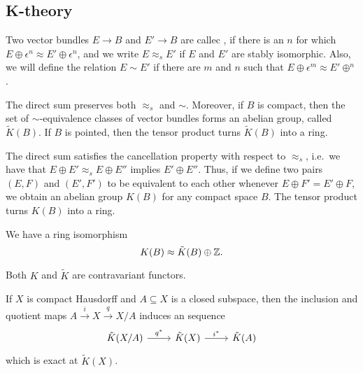 \documentclass{article}
\begin{document}
\subsection{K-theory}

\begin{defn}
Two vector bundles $E\to B$ and $E'\to B$ are callec ,
if there is an $n$ for which $E\oplus\epsilon^n\approx E'\oplus\epsilon^n$, and
we write $E\approx_s E'$ if $E$ and $E'$ are stably isomorphic. Also,
we will define the relation $E\sim E'$ if there are $m$ and $n$ such that
$E\oplus\epsilon^m\approx E'\oplus^n$. 
\end{defn}

\begin{lem}
The direct sum preserves both $\approx_s$ and $\sim$. Moreover, if $B$ is compact,
then the set of ${\sim}$-equivalence classes of vector bundles forms an abelian
group, called $\tilde{K}(B)$. If $B$ is pointed, then the tensor product turns 
$\tilde{K}(B)$ into a ring.
\end{lem}

\begin{lem}
The direct sum satisfies the cancellation property with respect to $\approx_s$,
i.e.~we have that $E\oplus E'\approx_s E\oplus E''$ implies $E'\oplus E''$. 
Thus, if we define two pairs $(E,F)$ and $(E',F')$ to be equivalent to each
other whenever $E\oplus F'=E'\oplus F$, we obtain an abelian group $K(B)$ for
any compact space $B$. The tensor product turns $K(B)$ into a ring.
\end{lem}

\begin{lem}
We have a ring isomorphism
\begin{equation*}
K(B)\approx \tilde{K}(B)\oplus\mathbb{Z}.
\end{equation*}
\end{lem}

Both $K$ and $\tilde{K}$ are contravariant functors.

\begin{lem}
If $X$ is compact Hausdorff and $A\subseteq X$ is a closed subspace, then the
inclusion and quotient maps $A\stackrel{i}{\to}X\stackrel{q}{\to}X/A$ induces
an sequence
\begin{equation*}
\begin{tikzcd}
\tilde{K}(X/A) \arrow[r,"q^\ast"] & \tilde{K}(X) \arrow[r,"i^\ast"] & \tilde{K}(A)
\end{tikzcd}
\end{equation*}
which is exact at $\tilde{K}(X)$.
\end{lem}
\end{document}

